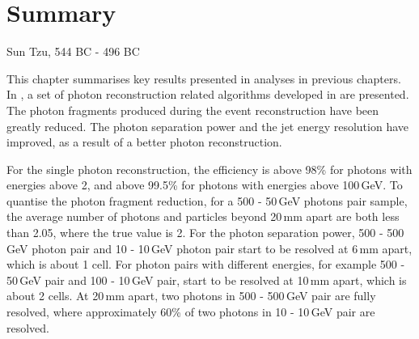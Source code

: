 \chapter{Summary}
\label{chap:summary}



%
{Sun Tzu, 544 BC - 496 BC}




This chapter summarises key results presented in analyses in previous chapters. In , a set of photon reconstruction related algorithms developed in \pandora are presented. The photon fragments produced during the event reconstruction have been greatly reduced. The photon separation power and the jet energy resolution have improved, as a result of a better photon reconstruction. 

For the single photon reconstruction, the efficiency is above 98\% for photons with energies above 2\GeV, and above 99.5\% for photons with energies above 100\,GeV. To quantise the photon fragment reduction, for a  500 - 50\,GeV photons pair sample, the average number of photons and particles beyond 20\,mm apart are both less than 2.05, where the true value is 2. For the photon separation power, 500 - 500\,GeV photon pair and 10 - 10\,GeV photon pair start to be resolved at 6\,mm apart, which is about 1 \ECAL cell. For photon pairs with different energies,  for example 500 - 50\,GeV pair and  100 - 10\,GeV pair, start to be resolved at 10\,mm apart, which is about 2 \ECAL cells. At 20\,mm apart, two photons in  500 - 500\,GeV pair are fully resolved, where approximately 60\% of two photons in 10 - 10\,GeV pair are resolved.

